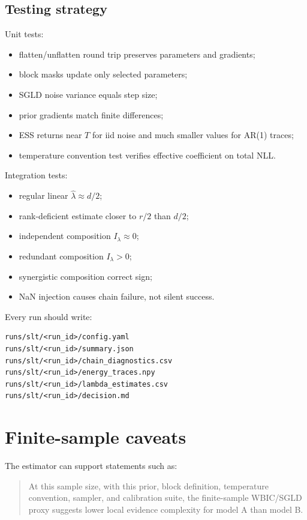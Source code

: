 \documentclass[11pt]{article}
\begin{document}
\subsection{Testing strategy}

Unit tests:
\begin{itemize}
\item flatten/unflatten round trip preserves parameters and gradients;
\item block masks update only selected parameters;
\item SGLD noise variance equals step size;
\item prior gradients match finite differences;
\item ESS returns near $T$ for iid noise and much smaller values for AR(1) traces;
\item temperature convention test verifies effective coefficient on total NLL.
\end{itemize}

Integration tests:
\begin{itemize}
\item regular linear $\hat\lambda\approx d/2$;
\item rank-deficient estimate closer to $r/2$ than $d/2$;
\item independent composition $I_\lambda\approx0$;
\item redundant composition $I_\lambda>0$;
\item synergistic composition correct sign;
\item NaN injection causes chain failure, not silent success.
\end{itemize}

Every run should write:
\begin{verbatim}
runs/slt/<run_id>/config.yaml
runs/slt/<run_id>/summary.json
runs/slt/<run_id>/chain_diagnostics.csv
runs/slt/<run_id>/energy_traces.npy
runs/slt/<run_id>/lambda_estimates.csv
runs/slt/<run_id>/decision.md
\end{verbatim}

\section{Finite-sample caveats}

The estimator can support statements such as:
\begin{quote}
At this sample size, with this prior, block definition, temperature convention, sampler, and calibration suite, the finite-sample WBIC/SGLD proxy suggests lower local evidence complexity for model A than model B.
\end{quote}
\end{document}
